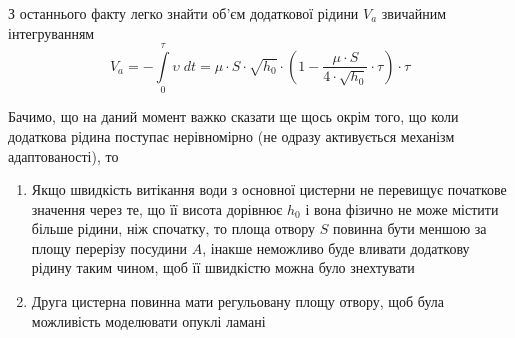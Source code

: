 З останнього факту легко знайти об’єм додаткової рідини $V_a$ звичайним
інтегруванням
\begin{equation*}
  V_a
  = - \int\limits_{0}^{\tau} \upsilon \; dt
  = \mu \cdot S \cdot \sqrt{h_0}
    \cdot \left( 1 - \frac{\mu \cdot S}{4 \cdot \sqrt{h_0}} \cdot \tau \right) \cdot \tau
\end{equation*}

Бачимо, що на даний момент важко сказати ще щось окрім того, що коли
додаткова рідина поступає нерівномірно (не одразу активується механізм
адаптованості), то
\begin{enumerate}
  \item Якщо швидкість витікання води з основної цистерни не перевищує початкове значення через те, що її висота дорівнює $h_0$ і вона фізично не може містити
    більше рідини, ніж спочатку, то площа отвору $S$ повинна бути меншою за площу перерізу посудини $A$, інакше неможливо буде вливати додаткову рідину таким чином,
    щоб її швидкістю можна було знехтувати
  \item Друга цистерна повинна мати регульовану площу отвору, щоб була можливість моделювати опуклі ламані
\end{enumerate}

